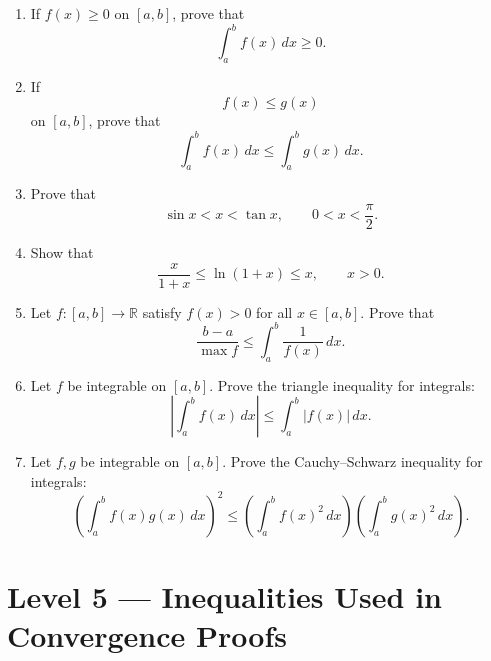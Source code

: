 \documentclass{essay}
\begin{document}
\begin{enumerate}[resume]

    \item If \(f(x)\ge0\) on \([a,b]\), prove that
    \[
        \int_a^b f(x)\,dx \ge 0.
    \]

    \item If
    \[
        f(x)\le g(x)
    \]
    on \([a,b]\), prove that
    \[
        \int_a^b f(x)\,dx
        \le
        \int_a^b g(x)\,dx.
    \]

    \item Prove that
    \[
        \sin x
        <
        x
        <
        \tan x,
        \qquad
        0<x<\frac{\pi}{2}.
    \]

    \item Show that
    \[
        \frac{x}{1+x}
        \le
        \ln(1+x)
        \le
        x,
        \qquad
        x>0.
    \]

    \item Let \(f:[a,b]\to\mathbb{R}\) satisfy \(f(x)>0\) for all \(x\in[a,b]\). Prove that
    \[
        \frac{b-a}{\max f}
        \le
        \int_a^b \frac{1}{f(x)}\,dx.
    \]

    \item Let \(f\) be integrable on \([a,b]\). Prove the triangle inequality for integrals:
    \[
        \left|\int_a^b f(x)\,dx\right|
        \le
        \int_a^b |f(x)|\,dx.
    \]

    \item Let \(f,g\) be integrable on \([a,b]\). Prove the Cauchy--Schwarz inequality for integrals:
    \[
        \left(\int_a^b f(x)g(x)\,dx\right)^{\!2}
        \le
        \left(\int_a^b f(x)^2\,dx\right)
        \left(\int_a^b g(x)^2\,dx\right).
    \]
\end{enumerate}

\section*{Level 5 --- Inequalities Used in Convergence Proofs}
\end{document}
